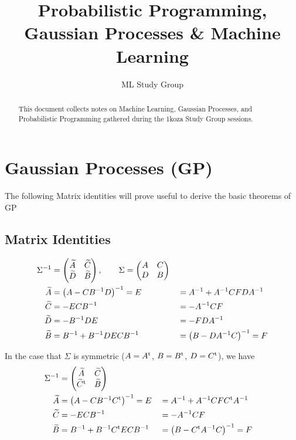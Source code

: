 \documentclass[nobib]{tufte-handout}
\title{Probabilistic Programming, Gaussian Processes \& Machine Learning}
\author[ML Study Group]{ML Study Group}
\begin{document}
\maketitle%

\begin{abstract}
\noindent
This document collects notes on Machine Learning, Gaussian Processes, and Probabilistic Programming gathered 
during the 1koza Study Group sessions.
\end{abstract}


\section{Gaussian Processes (GP)}\label{s:GP}
The following Matrix identities will prove useful to derive the basic theorems of GP\cite{Rasmussen2005}
\subsection{Matrix Identities}
\begin{align}
\Sigma^{-1} &= \begin{pmatrix}
  \widetilde{A} & \widetilde{C} \\
  \widetilde{D} & \widetilde{B}
\end{pmatrix}, \qquad \Sigma = \begin{pmatrix}
  A & C \\
  D & B
\end{pmatrix}&& \label{e:block_inverse} \\
\widetilde{A} &= \left(A - CB^{-1} D\right)^{-1}=E &&= A^{-1} + A^{-1}C FDA^{-1}\notag\\
\widetilde{C} &= -E C B^{-1} &&= -A^{-1} C F\notag\\
\widetilde{D} &= -B^{-1}DE &&= - F D A^{-1}\notag\\
\widetilde{B} &= B^{-1} + B^{-1}DECB^{-1} &&= \left(B - DA^{-1}C\right)^{-1} = F\notag
\end{align}

In the case that $\Sigma$ is symmetric ($A=A^\textrm{t}$, $B=B^\textrm{t}$, $D = C^\textrm{t}$), we have
\begin{align}
  \Sigma^{-1} &= \begin{pmatrix}
    \widetilde{A} & \widetilde{C} \\
    \widetilde{C}^\textrm{t} & \widetilde{B}
  \end{pmatrix}\label{e:sym_block_inverse}\\
  \widetilde{A} &= \left(A - C B^{-1}C^\textrm{t}\right)^{-1} = E &&= A^{-1} + A^{-1} C F C^\textrm{t}A^{-1}\notag\\
  \widetilde{C} &= - E C B^{-1} &&= -A^{-1}CF \notag\\
  \widetilde{B} &= B^{-1} + B^{-1}C^\textrm{t} E C B^{-1} &&= \left(B - C^\textrm{t}A^{-1}C\right)^{-1} = F\notag
\end{align}
\end{document}
